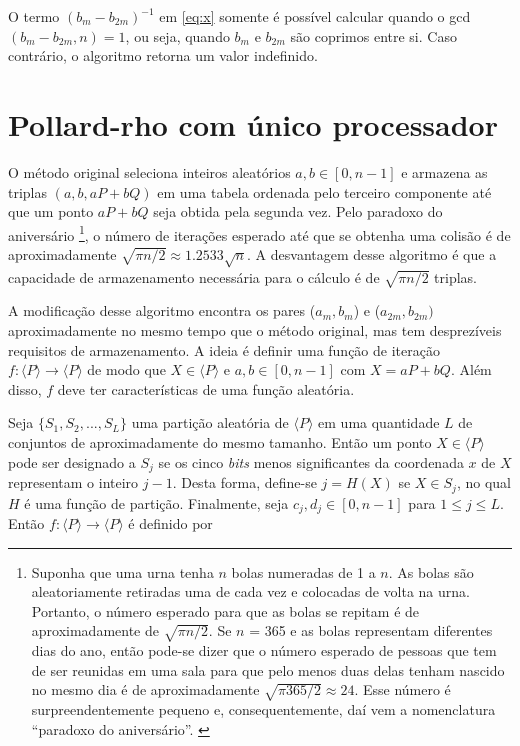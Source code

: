 O termo $(b_m - b_{2m})^{-1}$ em \ref{eq:x} somente é possível calcular quando o gcd$(b_m - b_{2m}, n) = 1$, ou seja, quando \(b_m\) e \(b_{2m}\) são coprimos entre si. Caso contrário, o algoritmo retorna um valor indefinido.

%
%
\section{Pollard-rho com único processador} \label{sec:single}
O método original seleciona inteiros aleatórios $a, b \in [0, n-1]$ e armazena as triplas $(a, b, aP + bQ)$ em uma tabela ordenada pelo terceiro componente até que um ponto $aP + bQ$ seja obtida pela segunda vez. Pelo paradoxo do aniversário
\footnote{Suponha que uma urna tenha \(n\) bolas numeradas de 1 a \(n\). As bolas são aleatoriamente retiradas uma de cada vez e colocadas de volta na urna. Portanto, o número esperado para que as bolas se repitam é de aproximadamente de $\sqrt{\pi n/2}$. Se \(n\) = 365 e as bolas representam diferentes dias do ano, então pode-se dizer que o número esperado de pessoas que tem de ser reunidas em uma sala para que pelo menos duas delas tenham nascido no mesmo dia é de aproximadamente $\sqrt{\pi 365/2} \approx 24$. Esse número é surpreendentemente pequeno e, consequentemente, daí vem a nomenclatura ``paradoxo do aniversário''. \cite{Guide}},
o número de iterações esperado até que se obtenha uma colisão é de aproximadamente $\sqrt{\pi n/2} \approx 1.2533 \sqrt{n}$. A desvantagem desse algoritmo é que a capacidade de armazenamento necessária para o cálculo é de $\sqrt{\pi n/2}$ triplas.

A modificação desse algoritmo encontra os pares ($a_m, b_m$) e ($a_{2m}, b_{2m})$ aproximadamente no mesmo tempo que o método original, mas tem desprezíveis requisitos de armazenamento. A ideia é definir uma função de iteração $f : \langle P \rangle \to \langle P \rangle$ de modo que $X \in \langle P \rangle$ e $a, b \in [0, n-1]$ com $X = aP + bQ$. Além disso, \(f\) deve ter características de uma função aleatória.

Seja $\{S_1, S_2, ..., S_L\}$ uma partição aleatória de $\langle P \rangle$ em uma quantidade \(L\) de conjuntos de aproximadamente do mesmo tamanho. Então um ponto $X \in \langle P \rangle$ pode ser designado a \(S_j\) se os cinco \textit{bits} menos significantes da coordenada \(x\) de \(X\) representam o inteiro \(j-1\). Desta forma, define-se $j = H(X)$ se $X \in S_j$, no qual \(H\) é uma função de partição. Finalmente, seja $c_j, d_j \in [0, n-1]$ para $1 \leq j \leq L$. Então $f : \langle P \rangle \to  \langle P \rangle$ é definido por

